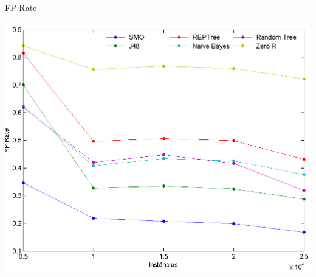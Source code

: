 \documentclass[
	12pt,				%
	openright,			%
	oneside,	
	a4paper,				%
	english,				%
	brazil				%
]{abntex2/abntex2} %
\begin{document}
\begin{grafico}[!htb]
	\caption{\label{graficofpRate} \fontsize{10}{\baselineskip} \selectfont FP Rate}
	\begin{center}
		\includegraphics[scale=0.6]{graphs/fp_graph.png}
	\end{center}
\end{grafico}
	

	
\end{document}
